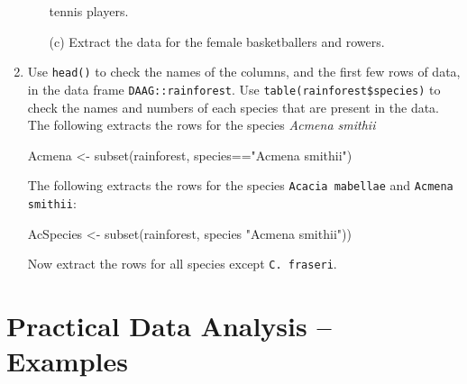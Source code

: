\documentclass{tufte-book}\usepackage[]{graphicx}\usepackage[]{color}
\begin{document}
\begin{enumerate}
\begin{itemize}
tennis players.
\item[(c)] Extract the data for the female basketballers and rowers.
\end{itemize}
\item Use \texttt{head()} to check the names of the columns, and the first
few rows of data, in the data frame \texttt{DAAG::rainforest}.
Use \verb!table(rainforest$species)! to check the names and numbers of
each species that are present in the data.
The following extracts the rows for the species \textit{Acmena smithii}
\begin{Schunk}
\begin{Sinput}
Acmena <- subset(rainforest, species=="Acmena smithii")
\end{Sinput}
\end{Schunk}
The following extracts the rows for the species \texttt{Acacia mabellae} and
\texttt{Acmena smithii}:
\begin{fullwidth}

\begin{Schunk}
\begin{Sinput}
AcSpecies <- subset(rainforest, species %
                                               "Acmena smithii"))
\end{Sinput}
\end{Schunk}

\end{fullwidth}
Now extract the rows for all species except \texttt{C. fraseri}.
\end{enumerate}
\cleartooddpage
\cleartooddpage

\chapter{Practical Data Analysis -- Examples}\label{ch:worked}

\end{document}

